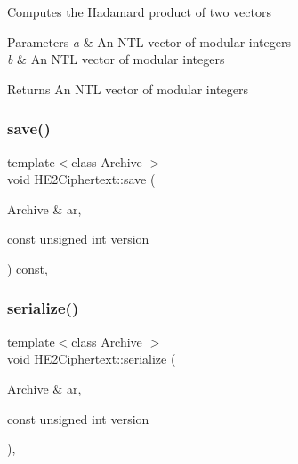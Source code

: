 Computes the Hadamard product of two vectors 
\begin{DoxyParams}{Parameters}
{\em a} & An N\+TL vector of modular integers \\
\hline
{\em b} & An N\+TL vector of modular integers \\
\hline
\end{DoxyParams}
\begin{DoxyReturn}{Returns}
An N\+TL vector of modular integers 
\end{DoxyReturn}
\mbox{\label{classHE2Ciphertext_a0fcff8ec1b87d67f22da109ba9cc4931}} 
\subsubsection{\texorpdfstring{save()}{save()}}
{\footnotesize\ttfamily template$<$class Archive $>$ \\
void H\+E2\+Ciphertext\+::save (\begin{DoxyParamCaption}\item[{Archive \&}]{ar,  }\item[{const unsigned int}]{version }\end{DoxyParamCaption}) const\hspace{0.3cm}{\ttfamily [inline]}, {\ttfamily [private]}}

\mbox{\label{classHE2Ciphertext_a143f80d41791ba3eff4f76b43734daec}} 
\subsubsection{\texorpdfstring{serialize()}{serialize()}}
{\footnotesize\ttfamily template$<$class Archive $>$ \\
void H\+E2\+Ciphertext\+::serialize (\begin{DoxyParamCaption}\item[{Archive \&}]{ar,  }\item[{const unsigned int}]{version }\end{DoxyParamCaption})\hspace{0.3cm}{\ttfamily [inline]}, {\ttfamily [private]}}

\mbox{\label{classHE2Ciphertext_a8369345555e2b6df742e238353bd8707}} 
